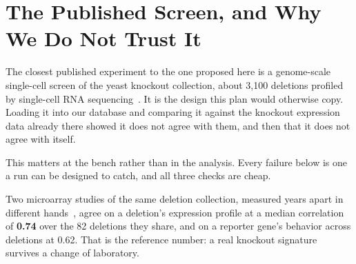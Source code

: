 
\section{The Published Screen, and Why We Do Not Trust It}
\label{sec:nadal}

The closest published experiment to the one proposed here is a genome-scale
single-cell screen of the yeast knockout collection, about 3{,}100 deletions
profiled by single-cell RNA
sequencing~\citep{nadal-ribellesSinglecellResolvedGenotypephenotype2025}. It is
the design this plan would otherwise copy. Loading it into our database and
comparing it against the knockout expression data already there showed it does
not agree with them, and then that it does not agree with itself.

This matters at the bench rather than in the analysis. Every failure below is
one a run can be designed to catch, and all three checks are cheap.

 Two microarray studies
of the same deletion collection, measured years apart in different
hands~\citep{kemmerenLargeScaleGeneticPerturbations2014,sameithHighresolutionGeneExpression2015},
agree on a deletion's expression profile at a median correlation of \textbf{0.74}
over the 82 deletions they share, and on a reporter gene's behavior across
deletions at 0.62. That is the reference number: a real knockout signature
survives a change of laboratory.

